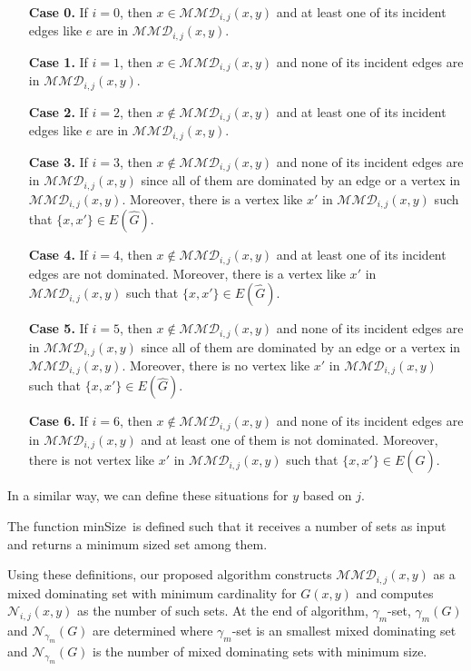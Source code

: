 \documentclass[12pt]{article}
\theoremstyle{definition}
\theoremstyle{remark}
\begin{document}
\begin{itemize}
	
	\item[\textbf{Case 0.}]
	 If $i=0$, then $x\in \mathcal{MMD}_{i,j}(x,y)$ and  at least one of its incident edges like $e$ are in $\mathcal{MMD}_{i,j}(x,y)$.
	 \item[\textbf{Case 1.}]
	 If $i=1$, then $x\in \mathcal{MMD}_{i,j}(x,y)$ and none of its incident edges are in $\mathcal{MMD}_{i,j}(x,y)$.
	\item[\textbf{Case 2.}]
	If $i=2$, then $x\notin \mathcal{MMD}_{i,j}(x,y)$ and at least one of its incident edges like $e$ are in $\mathcal{MMD}_{i,j}(x,y)$.
	\item[\textbf{Case 3.}]
	If $i=3$, then $x\notin \mathcal{MMD}_{i,j}(x,y)$ and  none of its incident edges are in $\mathcal{MMD}_{i,j}(x,y)$ since all of them are dominated by an edge or a vertex in $\mathcal{MMD}_{i,j}(x,y)$. Moreover, there is a vertex like $x'$ in $\mathcal{MMD}_{i,j}(x,y)$ such that $\{x,x'\} \in E(\hat{G})$.
	\item[\textbf{Case 4.}]
	If $i=4$, then $x\notin \mathcal{MMD}_{i,j}(x,y)$ and at least one of its incident edges are not dominated. Moreover, there is a vertex like $x'$ in $\mathcal{MMD}_{i,j}(x,y)$ such that $\{x,x'\} \in E(\hat{G})$.
	\item[\textbf{Case 5.}]
	If $i=5$, then $x\notin \mathcal{MMD}_{i,j}(x,y)$ and  none of its incident edges are in $\mathcal{MMD}_{i,j}(x,y)$ since all of them are dominated by an edge or a vertex in $\mathcal{MMD}_{i,j}(x,y)$. Moreover, there is no vertex like $x'$ in $\mathcal{MMD}_{i,j}(x,y)$ such that $\{x,x'\} \in E(\hat{G})$.
	\item[\textbf{Case 6.}]
	If $i=6$, then $x\notin \mathcal{MMD}_{i,j}(x,y)$ and none of its incident edges are in $\mathcal{MMD}_{i,j}(x,y)$ and at least one of them is not dominated. Moreover, there is not vertex like $x'$ in $\mathcal{MMD}_{i,j}(x,y)$ such that $\{x,x'\} \in E(\hat{G})$.
\end{itemize}
In a similar way, we can define these situations for $y$ based on $j$.

\newcommand{\Minsize}{\mbox{minSize}}
The function \Minsize\ is defined such that it receives a number of sets as input and returns a minimum sized set among them.

Using these definitions, our proposed algorithm constructs  $\mathcal{MMD}_{i,j}(x,y)$ as a mixed dominating set
with minimum cardinality for $G(x,y)$ and computes $\mathcal{N}_{i,j}(x,y)$ as the number of such sets.
At the end of algorithm, $\gamma_m$-set, $\gamma_m(G)$ and $\mathcal{N}_{\gamma_m}(G)$ are determined where $\gamma_m$-set is an smallest mixed dominating set and $\mathcal{N}_{\gamma_m}(G)$ is the number of mixed dominating sets with minimum size.
\end{document}
